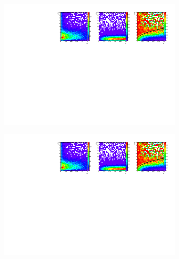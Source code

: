 \begin{figure}
	\centering
	\begin{subfigure}{0.33\textwidth}
		\includegraphics[clip, trim=0.1cm 0cm 13.9cm 0cm,width=0.99\textwidth]{ILD/plots/recovery-purity.pdf}
		\caption{\label{fig:RecoveryPurity_a_3} }
	\end{subfigure}%
	\begin{subfigure}{0.33\textwidth}
		\centering
		\includegraphics[clip, trim=6.78cm 0cm 7.3cm 0cm,width=0.99\textwidth]{ILD/plots/recovery-purity.pdf}
		\caption{\label{fig:RecoveryPurity_b_3} }
	\end{subfigure}
	\begin{subfigure}{0.33\textwidth}
		\centering

\end{subfigure}
\end{figure}
